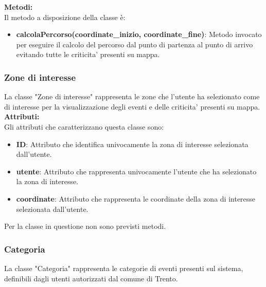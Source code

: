 \documentclass{article}
\begin{document}
\textbf{Metodi:}\\
Il metodo a disposizione della classe è:
\begin{itemize}
    \item \textbf{calcolaPercorso(coordinate\_inizio, coordinate\_fine)}: Metodo invocato per eseguire il calcolo del percorso dal punto di partenza al punto di arrivo evitando tutte le criticita' presenti su mappa.
\end{itemize}

\clearpage

\subsubsection{Zone di interesse}

La classe "Zone di interesse" rappresenta le zone che l'utente ha selezionato come di interesse per la visualizzazione degli eventi e delle criticita' presenti su mappa.\\

\textbf{Attributi:}\\
Gli attributi che caratterizzano questa classe sono:
\begin{itemize}
    \item \textbf{ID}: Attributo che identifica univocamente la zona di interesse selezionata dall'utente.
    \item \textbf{utente}: Attributo che rappresenta univocamente l'utente che ha selezionato la zona di interesse.
    \item \textbf{coordinate}: Attributo che rappresenta le coordinate della zona di interesse selezionata dall'utente.\\
\end{itemize}
Per la classe in questione non sono previsti metodi.

\subsubsection{Categoria}

La classe "Categoria" rappresenta le categorie di eventi presenti sul sistema, definibili dagli utenti autorizzati dal comune di Trento.\\
\end{document}
